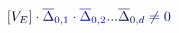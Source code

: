 \documentclass[12pt]{article}
\begin{document}
\makeatletter
\renewcommand*{\@textcolor}[3]{%
  \protect\leavevmode
  \begingroup
    \color#1{#2}#3%
  \endgroup
}
\makeatother
\begin{displaymath}
\mathcolor[RGB]{0,0,15}{[} \mathcolor[RGB]{0,0,30}{V} _ { \mathcolor[RGB]{0,0,45}{E} } \mathcolor[RGB]{0,0,60}{]} \mathcolor[RGB]{0,0,75}{\cdot} {\mathcolor[RGB]{0,0,90}{\overline { { \mathcolor[RGB]{0,0,105}{\Delta} } } }} _ { \mathcolor[RGB]{0,0,120}{0} \mathcolor[RGB]{0,0,135}{,} \mathcolor[RGB]{0,0,150}{1} } \mathcolor[RGB]{0,0,165}{\cdot} {\mathcolor[RGB]{0,0,180}{\overline { { \mathcolor[RGB]{0,0,195}{\Delta} } } }} _ { \mathcolor[RGB]{0,0,210}{0} \mathcolor[RGB]{0,0,225}{,} \mathcolor[RGB]{0,0,240}{2} } \mathcolor[RGB]{0,0,255}{.} \mathcolor[RGB]{0,15,0}{.} \mathcolor[RGB]{0,15,15}{.} {\mathcolor[RGB]{0,15,30}{\overline { { \mathcolor[RGB]{0,15,45}{\Delta} } } }} _ { \mathcolor[RGB]{0,15,60}{0} \mathcolor[RGB]{0,15,75}{,} \mathcolor[RGB]{0,15,90}{d} } \mathcolor[RGB]{0,15,105}{\neq} \mathcolor[RGB]{0,15,120}{0}
\end{displaymath}
\end{document}
